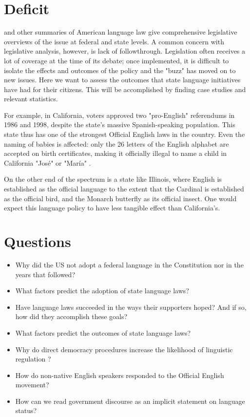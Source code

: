\documentclass{article}
\begin{document}
\section*{Deficit}

\textcite{Baron92} and other summaries of American language law give
comprehensive legislative overviews of the issue at federal and state levels. A
common concern with legislative analysis, however, is lack of followthrough.
Legislation often receives a lot of coverage at the time of its debate; once
implemented, it is difficult to isolate the effects and outcomes of the policy
and the "buzz" has moved on to new issues. Here we want to assess the outcomes
that state language initiatives have had for their citizens. This will be
accomplished by finding case studies and relevant statistics.

For example, in California, voters approved two "pro-English" referendums in
1986 and 1998, despite the state's massive Spanish-speaking population. This
state thus has one of the strongest Official English laws in the country.  Even
the naming of babies is affected: only the 26 letters of the English alphabet
are accepted on birth certificates, making it officially illegal to name a child
in California "José" or "María" \parencite{larson11}.

On the other end of the spectrum is a state like Illinois, where English is
established as the official language to the extent that the Cardinal is
established as the official bird, and the Monarch butterfly as its official
insect. One would expect this language policy to have less tangible effect than
California's.

\section*{Questions}

\begin{itemize}

\item Why did the US not adopt a federal language in the Constitution nor in the
  years that followed?
\item What factors predict the adoption of state language laws?
\item Have language laws succeeded in the ways their supporters hoped? And if so,
  how did they accomplish these goals?
\item What factors predict the outcomes of state language laws?
\item Why do direct democracy procedures increase the likelihood of linguistic
  regulation \parencite{Liu14}?
\item How do non-native English speakers responded to the Official English
  movement?
\item How can we read government discourse as an implicit statement on language
  status?

\end{itemize}
\end{document}
